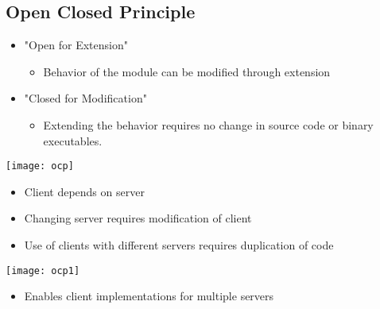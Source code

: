 \documentclass[xcolor=svgnames]{beamer}
\begin{document}

\subsection{Open Closed Principle}


\begin{frame}{\subsecname}

    \begin{itemize}
        \pause \item "Open for Extension"
        \begin{itemize}
            \pause \item Behavior of the module can be modified through
                extension
        \end{itemize}
        \pause \item "Closed for Modification"
        \begin{itemize}
            \pause \item Extending the behavior requires no change in source
                code or binary executables.
        \end{itemize}
    \end{itemize}

\end{frame}


\begin{frame}{\subsecname}
    \centering
    \texttt{[image: ocp]}
    \begin{itemize}
        \pause \item Client depends on server
        \pause \item Changing server requires modification of client
        \pause \item Use of clients with different servers requires duplication
            of code
    \end{itemize}
\end{frame}


\begin{frame}{\subsecname}
    \centering
    \texttt{[image: ocp1]}
    \begin{itemize}
        \pause \item Enables client implementations for multiple servers
    \end{itemize}
\end{frame}
\end{document}
